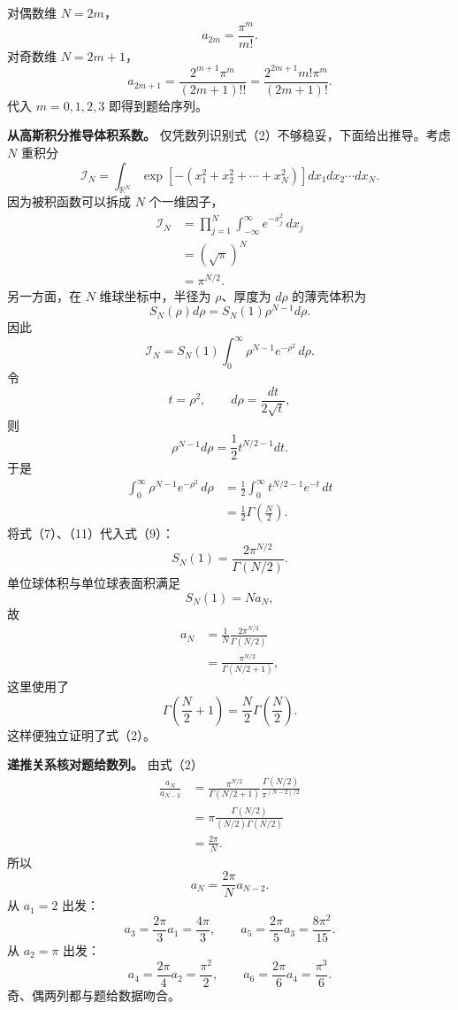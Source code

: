 \documentclass[12pt,a4paper,UTF8]{ctexart}
\begin{document}
对偶数维 \(N=2m\)， \[
a_{2m}=\frac{\pi^m}{m!}. \tag{4}
\] 对奇数维 \(N=2m+1\)， \[
a_{2m+1}
=\frac{2^{m+1}\pi^m}{(2m+1)!!}
=\frac{2^{2m+1}m!\pi^m}{(2m+1)!}. \tag{5}
\] 代入 \(m=0,1,2,3\) 即得到题给序列。

\textbf{从高斯积分推导体积系数。}
仅凭数列识别式（2）不够稳妥，下面给出推导。考虑 \(N\) 重积分 \[
\mathcal I_N
=\int_{\mathbb R^N}
\exp\left[-(x_1^2+x_2^2+\cdots+x_N^2)\right]
dx_1dx_2\cdots dx_N. \tag{6}
\] 因为被积函数可以拆成 \(N\) 个一维因子， \[
\begin{aligned}
\mathcal I_N
&=\prod_{j=1}^N
\int_{-\infty}^{\infty}e^{-x_j^2}\,dx_j\\
&=(\sqrt\pi)^N\\
&=\pi^{N/2}.
\end{aligned} \tag{7}
\] 另一方面，在 \(N\) 维球坐标中，半径为 \(\rho\)、厚度为 \(d\rho\)
的薄壳体积为 \[
S_N(\rho)d\rho
=S_N(1)\rho^{N-1}d\rho. \tag{8}
\] 因此 \[
\mathcal I_N
=S_N(1)
\int_0^\infty
\rho^{N-1}e^{-\rho^2}\,d\rho. \tag{9}
\] 令 \[
t=\rho^2,
\qquad
d\rho=\frac{dt}{2\sqrt t},
\] 则 \[
\rho^{N-1}d\rho
=\frac12t^{N/2-1}dt. \tag{10}
\] 于是 \[
\begin{aligned}
\int_0^\infty
\rho^{N-1}e^{-\rho^2}\,d\rho
&=\frac12
\int_0^\infty t^{N/2-1}e^{-t}\,dt\\
&=\frac12\Gamma\left(\frac N2\right).
\end{aligned} \tag{11}
\] 将式（7）、（11）代入式（9）： \[
\boxed{
S_N(1)
=\frac{2\pi^{N/2}}{\Gamma(N/2)}
}. \tag{12}
\] 单位球体积与单位球表面积满足 \[
S_N(1)=Na_N, \tag{13}
\] 故 \[
\begin{aligned}
a_N
&=\frac1N
\frac{2\pi^{N/2}}{\Gamma(N/2)}\\
&=\frac{\pi^{N/2}}
{\Gamma(N/2+1)},
\end{aligned} \tag{14}
\] 这里使用了 \[
\Gamma\left(\frac N2+1\right)
=\frac N2\Gamma\left(\frac N2\right).
\] 这样便独立证明了式（2）。

\textbf{递推关系核对题给数列。} 由式（2） \[
\begin{aligned}
\frac{a_N}{a_{N-2}}
&=\frac{\pi^{N/2}}
{\Gamma(N/2+1)}
\frac{\Gamma(N/2)}{\pi^{(N-2)/2}}\\
&=\pi
\frac{\Gamma(N/2)}
{(N/2)\Gamma(N/2)}\\
&=\frac{2\pi}{N}.
\end{aligned} \tag{15}
\] 所以 \[
\boxed{
a_N=\frac{2\pi}{N}a_{N-2}
}. \tag{16}
\] 从 \(a_1=2\) 出发： \[
a_3=\frac{2\pi}{3}a_1=\frac{4\pi}{3},
\qquad
a_5=\frac{2\pi}{5}a_3=\frac{8\pi^2}{15}.
\] 从 \(a_2=\pi\) 出发： \[
a_4=\frac{2\pi}{4}a_2=\frac{\pi^2}{2},
\qquad
a_6=\frac{2\pi}{6}a_4=\frac{\pi^3}{6}.
\] 奇、偶两列都与题给数据吻合。
\end{document}
